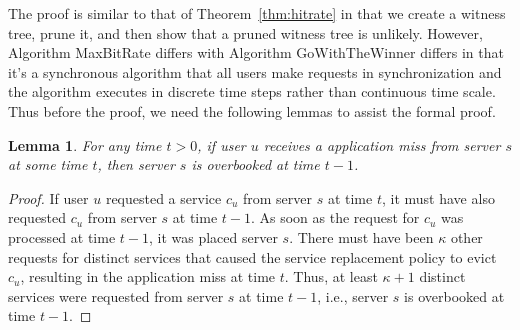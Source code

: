 \documentclass[conference]{IEEEtran}
\newtheorem{lemma}[theorem]{Lemma}
\begin{document}
The proof is similar to that of Theorem~\ref{thm:hitrate} in that we create a witness tree, prune  it, and then show that a pruned witness tree is unlikely. However, Algorithm MaxBitRate differs with Algorithm GoWithTheWinner differs in that it's a synchronous algorithm that all users make requests in synchronization and the algorithm executes in discrete time steps rather than continuous time scale. Thus before the proof, we need the following lemmas to assist the formal proof.

\begin{lemma}
\label{lem:cachemiss}
For any time $t > 0$, if user $u$ receives a application miss from server $s$ at some time $t$,  then server $s$ is overbooked at time $t - 1$.
\end{lemma}
\begin{proof}
If user $u$ requested a service $c_u$ from server $s$ at time $t$, it must have also requested $c_u$ from server $s$ at time $t - 1$.  As soon as the request  for $c_u$ was processed at time $t -1$, it was placed server $s$. There must have been $\kappa$ other requests for distinct services that caused the service replacement policy to evict $c_u$,  resulting in the application miss at time $t$. Thus, at least $\kappa + 1$ distinct services were requested from server $s$ at time $t - 1$, i.e., server $s$ is overbooked at time $t -1$.
\end{proof}
\end{document}
